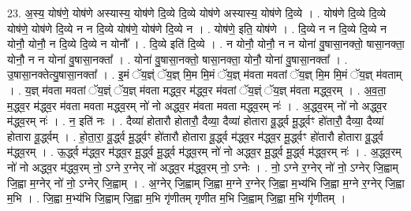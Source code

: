 \documentclass[17pt]{extarticle}
\begin{document}
23. अ॒स्य॒ योष॑णे॒ योष॑णे अस्यास्य॒ योष॑णे दि॒व्ये दि॒व्ये योष॑णे अस्यास्य॒ योष॑णे दि॒व्ये । . योष॑णे दि॒व्ये दि॒व्ये योष॑णे॒ योष॑णे दि॒व्ये न न दि॒व्ये योष॑णे॒ योष॑णे दि॒व्ये न । . योष॑णे॒ इति॒ योष॑णे । . दि॒व्ये न न दि॒व्ये दि॒व्ये न योनौ॒ योनौ॒ न दि॒व्ये दि॒व्ये न योनौ᳚ । . दि॒व्ये इति॑ दि॒व्ये । . न योनौ॒ योनौ॒ न न योना॑ वु॒षासा॒नक्तो॒ षासा॒नक्ता॒ योनौ॒ न न योना॑ वु॒षासा॒नक्ता᳚ । . योना॑ वु॒षासा॒नक्तो॒ षासा॒नक्ता॒ योनौ॒ योना॑ वु॒षासा॒नक्ता᳚ । . उ॒षासा॒नक्तेत्यु॒षासा॒नक्ता᳚ । . इ॒मं ॅय॒ज्ञ्ं ॅय॒ज्ञ् मि॒म मि॒मं ॅय॒ज्ञ् म॑वता मवतां ॅय॒ज्ञ् मि॒म मि॒मं ॅय॒ज्ञ् म॑वताम् । . य॒ज्ञ् म॑वता मवतां ॅय॒ज्ञ्ं ॅय॒ज्ञ् म॑वता मद्ध्व॒र म॑द्ध्व॒र म॑वतां ॅय॒ज्ञ्ं ॅय॒ज्ञ् म॑वता मद्ध्व॒रम् । . अ॒व॒ता॒ म॒द्ध्व॒र म॑द्ध्व॒र म॑वता मवता मद्ध्व॒रम् नो॑ नो अद्ध्व॒र म॑वता मवता मद्ध्व॒रम् नः॑ । . अ॒द्ध्व॒रम् नो॑ नो अद्ध्व॒र म॑द्ध्व॒रम् नः॑ । . न॒ इति॑ नः । . दैव्या॑ होतारौ होतारौ॒ दैव्या॒ दैव्या॑ होतारा वू॒र्द्ध्व मू॒र्द्ध्वꣳ हो॑तारौ॒ दैव्या॒ दैव्या॑ होतारा वू॒र्द्ध्वम् । . हो॒ता॒रा॒ वू॒र्द्ध्व मू॒र्द्ध्वꣳ हो॑तारौ होतारा वू॒र्द्ध्व म॑द्ध्व॒र म॑द्ध्व॒र मू॒र्द्ध्वꣳ हो॑तारौ होतारा वू॒र्द्ध्व म॑द्ध्व॒रम् । . ऊ॒र्द्ध्व म॑द्ध्व॒र म॑द्ध्व॒र मू॒र्द्ध्व मू॒र्द्ध्व म॑द्ध्व॒रम् नो॑ नो अद्ध्व॒र मू॒र्द्ध्व मू॒र्द्ध्व म॑द्ध्व॒रम् नः॑ । . अ॒द्ध्व॒रम् नो॑ नो अद्ध्व॒र म॑द्ध्व॒रम् नो॒ ऽग्ने र॒ग्नेर् नो॑ अद्ध्व॒र म॑द्ध्व॒रम् नो॒ ऽग्नेः । . नो॒ ऽग्ने र॒ग्नेर् नो॑ नो॒ ऽग्नेर् जि॒ह्वाम् जि॒ह्वा म॒ग्नेर् नो॑ नो॒ ऽग्नेर् जि॒ह्वाम् । . अ॒ग्नेर् जि॒ह्वाम् जि॒ह्वा म॒ग्ने र॒ग्नेर् जि॒ह्वा म॒भ्य॑भि जि॒ह्वा म॒ग्ने र॒ग्नेर् जि॒ह्वा म॒भि । . जि॒ह्वा म॒भ्य॑भि जि॒ह्वाम् जि॒ह्वा म॒भि गृ॑णीतम् गृणीत म॒भि जि॒ह्वाम् जि॒ह्वा म॒भि गृ॑णीतम् । \newline
\end{document}
